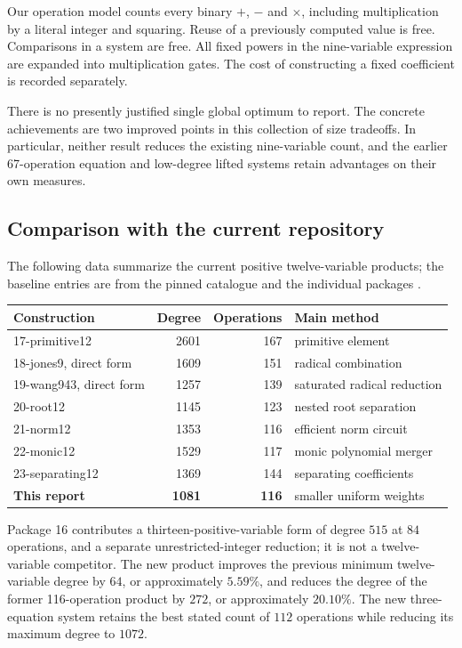 Our operation model counts every binary $+$, $-$ and $\times$, including
multiplication by a literal integer and squaring. Reuse of a previously
computed value is free. Comparisons in a system are free. All fixed powers
in the nine-variable expression are expanded into multiplication gates.
The cost of constructing a fixed coefficient is recorded separately.

There is no presently justified single global optimum to report. The
concrete achievements are two improved points in this collection of size
tradeoffs. In particular, neither result reduces the existing nine-variable
count, and the earlier 67-operation equation and low-degree lifted systems
retain advantages on their own measures.

\subsection{Comparison with the current repository}
The following data summarize the current positive twelve-variable products;
the baseline entries are from the pinned catalogue and the individual
packages \cite{catalogue,p17,p18,p19,p20,p21,p22,p23}.
\begin{center}
\begin{tabular}{lrrl}
\toprule
Construction & Degree & Operations & Main method\\
\midrule
17-primitive12 & 2601 & 167 & primitive element\\
18-jones9, direct form & 1609 & 151 & radical combination\\
19-wang943, direct form & 1257 & 139 & saturated radical reduction\\
20-root12 & 1145 & 123 & nested root separation\\
21-norm12 & 1353 & 116 & efficient norm circuit\\
22-monic12 & 1529 & 117 & monic polynomial merger\\
23-separating12 & 1369 & 144 & separating coefficients\\
\textbf{This report} & \textbf{1081} & \textbf{116} & smaller uniform weights\\
\bottomrule
\end{tabular}
\end{center}
Package 16 contributes a thirteen-positive-variable form of degree $515$ at
$84$ operations, and a separate unrestricted-integer reduction; it is not a
twelve-variable competitor. The new product improves the previous minimum
twelve-variable degree by $64$, or approximately $5.59\%$, and reduces the
degree of the former 116-operation product by $272$, or approximately
$20.10\%$. The new three-equation system retains the best stated count of
$112$ operations while reducing its maximum degree to $1072$.

